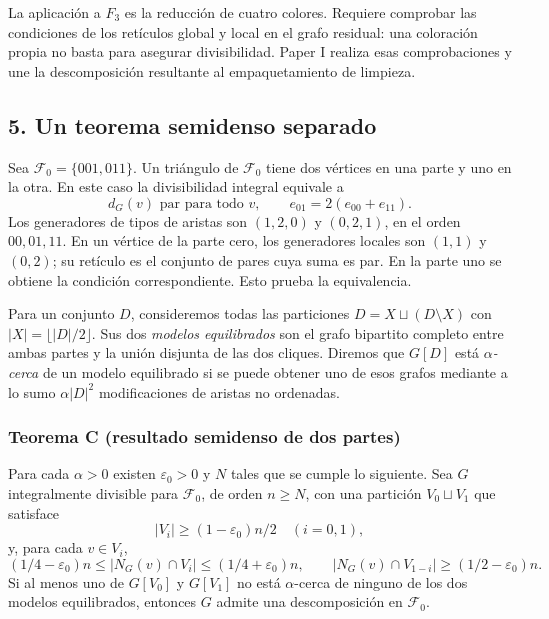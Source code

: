 \documentclass[spanish,11pt,a4paper]{article}
\begin{document}
La aplicación a \(F_3\) es la reducción de cuatro colores. Requiere comprobar las condiciones de los retículos global y local en el grafo residual: una coloración propia no basta para asegurar divisibilidad. Paper I realiza esas comprobaciones y une la descomposición resultante al empaquetamiento de limpieza.


\subsection{5. Un teorema semidenso separado}\label{un-teorema-semidenso-separado}

Sea \(\mathcal F_0=\{001,011\}\). Un triángulo de \(\mathcal F_0\) tiene dos vértices en una parte y uno en la otra. En este caso la divisibilidad integral equivale a \[d_G(v)\text{ par para todo }v,\qquad e_{01}=2(e_{00}+e_{11}).
\tag{5.1}\] Los generadores de tipos de aristas son \((1,2,0)\) y \((0,2,1)\), en el orden \(00,01,11\). En un vértice de la parte cero, los generadores locales son \((1,1)\) y \((0,2)\); su retículo es el conjunto de pares cuya suma es par. En la parte uno se obtiene la condición correspondiente. Esto prueba la equivalencia.

Para un conjunto \(D\), consideremos todas las particiones \(D=X\sqcup(D\setminus X)\) con \(|X|=\lfloor|D|/2\rfloor\). Sus dos \emph{modelos equilibrados} son el grafo bipartito completo entre ambas partes y la unión disjunta de las dos cliques. Diremos que \(G[D]\) está \emph{\(\alpha\)-cerca} de un modelo equilibrado si se puede obtener uno de esos grafos mediante a lo sumo \(\alpha|D|^2\) modificaciones de aristas no ordenadas.

\subsubsection{Teorema C (resultado semidenso de dos partes)}\label{teorema-c-resultado-semidenso-de-dos-partes}

Para cada \(\alpha>0\) existen \(\varepsilon_0>0\) y \(N\) tales que se cumple lo siguiente. Sea \(G\) integralmente divisible para \(\mathcal F_0\), de orden \(n\ge N\), con una partición \(V_0\sqcup V_1\) que satisface \[|V_i|\ge(1-\varepsilon_0)n/2\quad(i=0,1),
\tag{5.2}\] y, para cada \(v\in V_i\), \[(1/4-\varepsilon_0)n\le |N_G(v)\cap V_i|\le(1/4+\varepsilon_0)n,
\qquad |N_G(v)\cap V_{1-i}|\ge(1/2-\varepsilon_0)n.
\tag{5.3}\] Si al menos uno de \(G[V_0]\) y \(G[V_1]\) no está \(\alpha\)-cerca de ninguno de los dos modelos equilibrados, entonces \(G\) admite una descomposición en \(\mathcal F_0\).
\end{document}
